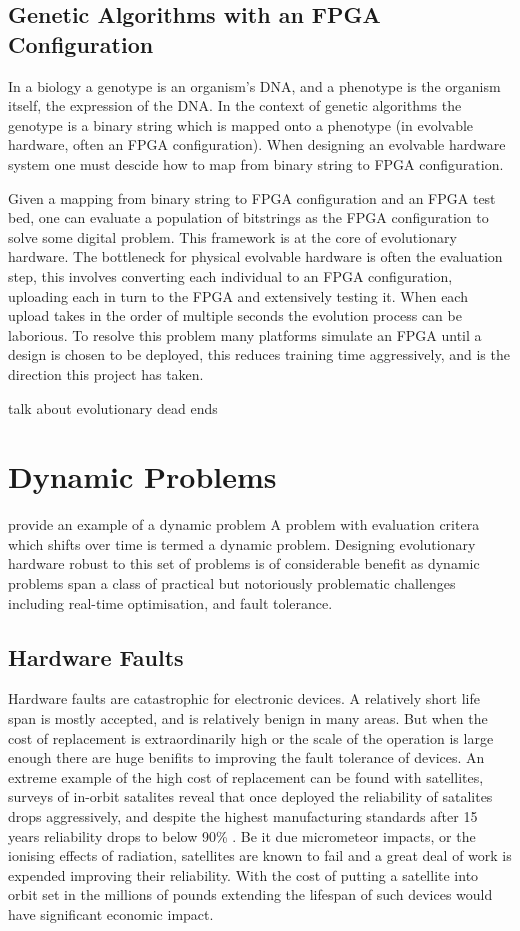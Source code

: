 \subsection{Genetic Algorithms with an FPGA Configuration}
In a biology a genotype is an organism's DNA, and a phenotype is
the organism itself, the expression of the DNA. In the context of genetic algorithms
the genotype is a binary string which is mapped onto a phenotype (in evolvable
hardware, often an FPGA configuration). When designing an evolvable hardware
system one must descide how to map from binary string to FPGA configuration.

Given a mapping from binary string to FPGA configuration and an FPGA test bed, one can
evaluate a population of bitstrings as the FPGA configuration to solve some digital
problem. This framework is at the core of evolutionary hardware. The bottleneck for physical evolvable
hardware is often the evaluation step, this involves converting each individual
to an FPGA configuration, uploading each in turn
to the FPGA and extensively testing it. When each upload takes in the order of
multiple seconds the evolution process can be laborious. To resolve this problem
many platforms simulate an FPGA until a design is chosen to be deployed, this reduces
training time aggressively, and is the direction this project has taken.

\todo talk about evolutionary dead ends

\section{Dynamic Problems}

\todo provide an example of a dynamic problem
A problem with evaluation critera which shifts over time is termed a dynamic problem. Designing
evolutionary hardware robust to this set of problems is of considerable benefit as
dynamic problems span a class of practical but notoriously problematic challenges including
real-time optimisation, and fault tolerance.

\subsection{Hardware Faults}
Hardware faults are catastrophic for electronic devices. A relatively short life span is
mostly accepted, and is relatively benign in many areas. But when the cost of replacement is
extraordinarily high or the scale of the operation is large enough there are huge benifits
to improving the fault tolerance of devices. An extreme example of the high cost of replacement
can be found with satellites, surveys of in-orbit satalites reveal that once deployed the
reliability of satalites drops aggressively, and despite the highest manufacturing standards
after 15 years reliability drops to below
90\% \cite{CASTET20091718}. Be it due micrometeor impacts,
or the ionising effects of radiation, satellites are known to fail and a great deal of
work is expended improving their reliability. With the cost
of putting a satellite into orbit set in the millions of pounds extending the lifespan
of such devices would have significant economic impact.

